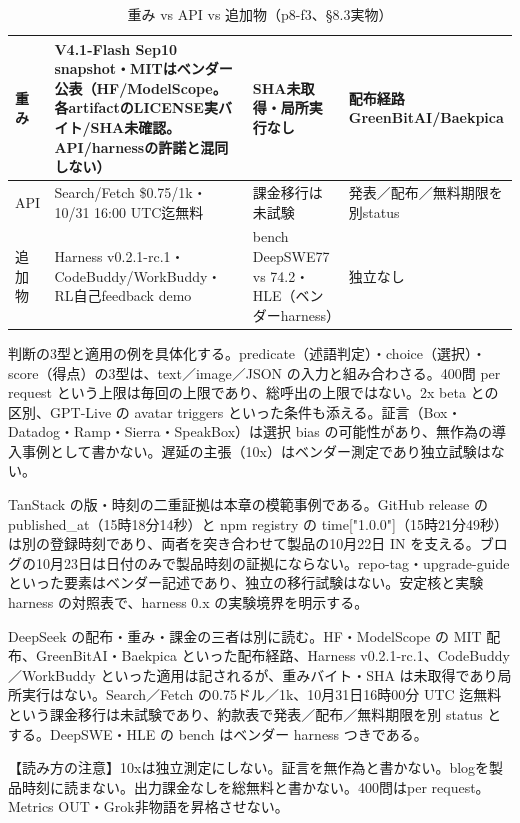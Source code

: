 \documentclass[lualatex,a4paper,10pt]{jlreq}
\begin{document}
\begin{table}[htbp]\centering\footnotesize
\caption{重み vs API vs 追加物（p8-f3、§8.3実物）}
\begin{tabularx}{0.96\linewidth}{@{}lXXX@{}}
\toprule
重み & V4.1-Flash Sep10 snapshot・MITはベンダー公表（HF/ModelScope。各artifactのLICENSE実バイト/SHA未確認。API/harnessの許諾と混同しない） & SHA未取得・局所実行なし & 配布経路GreenBitAI/Baekpica \\
\midrule
API & Search/Fetch \$0.75/1k・10/31 16:00 UTC迄無料 & 課金移行は未試験 & 発表／配布／無料期限を別status \\
追加物 & Harness v0.2.1-rc.1・CodeBuddy/WorkBuddy・RL自己feedback demo & bench DeepSWE77 vs 74.2・HLE（ベンダーharness） & 独立なし \\
\bottomrule
\end{tabularx}
\end{table}


判断の3型と適用の例を具体化する。predicate（述語判定）・choice（選択）・score（得点）の3型は、text／image／JSON の入力と組み合わさる。400問 per request という上限は毎回の上限であり、総呼出の上限ではない。2x beta との区別、GPT-Live の avatar triggers といった条件も添える。証言（Box・Datadog・Ramp・Sierra・SpeakBox）は選択 bias の可能性があり、無作為の導入事例として書かない。遅延の主張（10x）はベンダー測定であり独立試験はない。


TanStack の版・時刻の二重証拠は本章の模範事例である。GitHub release の published\_at（15時18分14秒）と npm registry の time["1.0.0"]（15時21分49秒）は別の登録時刻であり、両者を突き合わせて製品の10月22日 IN を支える。ブログの10月23日は日付のみで製品時刻の証拠にならない。repo-tag・upgrade-guide といった要素はベンダー記述であり、独立の移行試験はない。安定核と実験 harness の対照表で、harness 0.x の実験境界を明示する。


DeepSeek の配布・重み・課金の三者は別に読む。HF・ModelScope の MIT 配布、GreenBitAI・Baekpica といった配布経路、Harness v0.2.1-rc.1、CodeBuddy／WorkBuddy といった適用は記されるが、重みバイト・SHA は未取得であり局所実行はない。Search／Fetch の0.75ドル／1k、10月31日16時00分 UTC 迄無料という課金移行は未試験であり、約款表で発表／配布／無料期限を別 status とする。DeepSWE・HLE の bench はベンダー harness つきである。


\begin{tcolorbox}[colback=SurveySoft,colframe=SurveyRule,arc=1mm,boxrule=0.4pt,left=2mm,right=2mm]
【読み方の注意】10xは独立測定にしない。証言を無作為と書かない。blogを製品時刻に読まない。出力課金なしを総無料と書かない。400問はper request。Metrics OUT・Grok非物語を昇格させない。

\end{tcolorbox}
\end{document}
